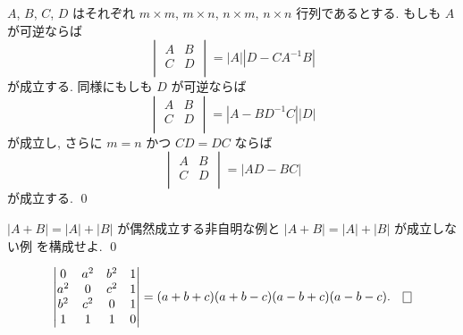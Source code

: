\documentclass[12pt,twoside]{jarticle}
\begin{document}
\begin{question}
  \label{q:det-ABCD}
  $A$, $B$, $C$, $D$ はそれぞれ $m\times m$, $m\times n$, $n\times m$, 
  $n\times n$ 行列であるとする. もしも $A$ が可逆ならば
  \begin{equation*}
    \begin{vmatrix}
      A & B \\
      C & D \\
    \end{vmatrix}
    = |A||D-CA^{-1}B|
  \end{equation*}
  が成立する. 同様にもしも $D$ が可逆ならば
  \begin{equation*}
    \begin{vmatrix}
      A & B \\
      C & D \\
    \end{vmatrix}
    = |A-BD^{-1}C||D|
  \end{equation*}
  が成立し, さらに $m=n$ かつ $CD=DC$ ならば
  \begin{equation*}
    \begin{vmatrix}
      A & B \\
      C & D \\
    \end{vmatrix}
    = |AD-BC|
  \end{equation*}
  が成立する. \qed
\end{question}


\begin{question}
  $|A+B|=|A|+|B|$ が偶然成立する非自明な例と $|A+B|=|A|+|B|$ が成立しない例
  を構成せよ. \qed
\end{question}


\begin{question}
  \begin{equation*}
    \begin{vmatrix}
      0   & a^2 & b^2 & 1 \\
      a^2 & 0   & c^2 & 1 \\
      b^2 & c^2 & 0   & 1 \\
      1   & 1   & 1   & 0 \\
    \end{vmatrix}
    = (a+b+c)(a+b-c)(a-b+c)(a-b-c).
    \qed
  \end{equation*}
\end{question}
\end{document}
